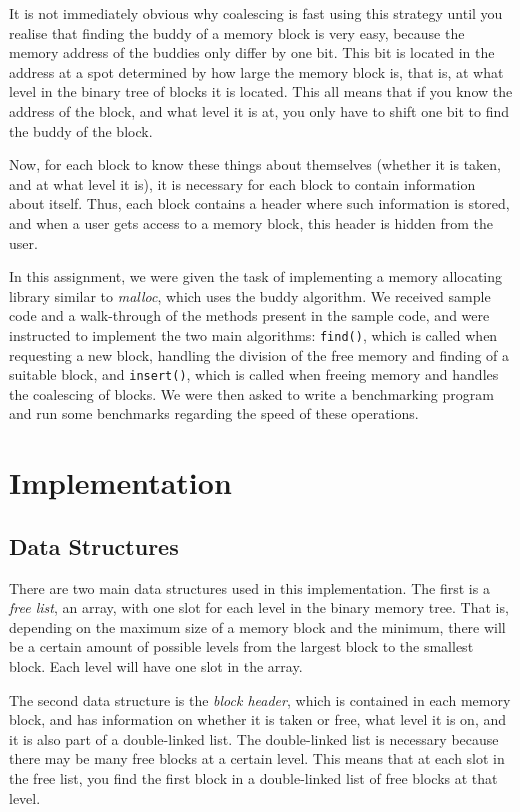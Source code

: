\documentclass{article}
\def\code#1{\texttt{#1}}
\begin{document}
It is not immediately obvious why coalescing is fast using this strategy until you realise that finding the buddy of a memory block is very easy, because the memory address of the buddies only differ by one bit. This bit is located in the address at a spot determined by how large the memory block is, that is, at what level in the binary tree of blocks it is located. This all means that if you know the address of the block, and what level it is at, you only have to shift one bit to find the buddy of the block.

Now, for each block to know these things about themselves (whether it is taken, and at what level it is), it is necessary for each block to contain information about itself. Thus, each block contains a header where such information is stored, and when a user gets access to a memory block, this header is hidden from the user.

In this assignment, we were given the task of implementing a memory allocating library similar to \textit{malloc}, which uses the buddy algorithm. We received sample code and a walk-through of the methods present in the sample code, and were instructed to implement the two main algorithms: \code{find()}, which is called when requesting a new block, handling the division of the free memory and finding of a suitable block, and \code{insert()}, which is called when freeing memory and handles the coalescing of blocks. We were then asked to write a benchmarking program and run some benchmarks regarding the speed of these operations.

\section{Implementation}

\subsection{Data Structures}

There are two main data structures used in this implementation. The first is a \textit{free list}, an array, with one slot for each level in the binary memory tree. That is, depending on the maximum size of a memory block and the minimum, there will be a certain amount of possible levels from the largest block to the smallest block. Each level will have one slot in the array.

The second data structure is the \textit{block header}, which is contained in each memory block, and has information on whether it is taken or free, what level it is on, and it is also part of a double-linked list. The double-linked list is necessary because there may be many free blocks at a certain level. This means that at each slot in the free list, you find the first block in a double-linked list of free blocks at that level.
\end{document}
